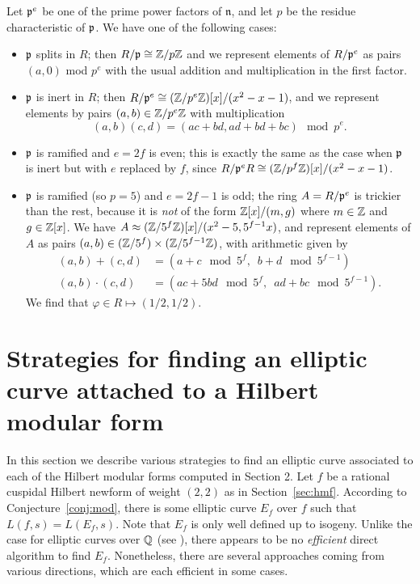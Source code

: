 \documentclass{amsart}
\newcommand{\n}{\mathfrak{n}}
\begin{document}
Let $\mathfrak{p}^e$ be one of the prime power factors of $\n$, and let $p$ be the residue
characteristic of $\mathfrak{p}$. We have one of the following cases:
\begin{itemize}
\item $\mathfrak{p}$ splits in $R$; then $R/\mathfrak{p}\cong \mathbb{Z}/p\mathbb{Z}$ and we represent elements
of $R/\mathfrak{p}^e$ as pairs $(a,0)$ mod $p^e$ with the usual addition and multiplication
in the first factor.
\item $\mathfrak{p}$ is inert in $R$; then $R/\mathfrak{p}^e\cong (\mathbb{Z}/p^e\mathbb{Z})[x]/(x^2-x-1)$,
and we represent elements by pairs $(a,b) \in \mathbb{Z}/p^e\mathbb{Z}$ with multiplication
$$(a,b)(c,d) = (ac+bd,ad+bd+bc) \mod p^e.$$
\item $\mathfrak{p}$ is ramified and $e=2f$ is even; this is exactly the
same as the case when $\mathfrak{p}$ is inert but with $e$ replaced by $f$,
since $R/\mathfrak{p}^eR \cong (\mathbb{Z}/p^{f}\mathbb{Z})[x]/(x^2-x-1)$.
\item $\mathfrak{p}$ is ramified (so $p=5$) and $e=2f-1$ is odd; the ring $A=R/\mathfrak{p}^e$
  is trickier than the rest, because it is {\em not} of the form
  $\mathbb{Z}[x]/(m,g)$ where $m\in\mathbb{Z}$ and $g \in\mathbb{Z}[x]$.  We have $A \approx
  (\mathbb{Z}/5^f\mathbb{Z})[x]/(x^2-5, 5^{f-1}x)$, and represent elements of $A$ as
  pairs $(a,b) \in (\mathbb{Z}/5^f)\times (\mathbb{Z}/5^{f-1}\mathbb{Z})$, with arithmetic
  given by
\begin{align*}
(a,b) + (c,d) &= (a+c \mod 5^f,\,\,\, b+d \mod 5^{f-1})\\
(a,b)\cdot (c,d) &= (ac+5bd \mod 5^f,\,\,\, ad+bc \mod 5^{f-1}).
\end{align*}
 We find that $ \varphi \in R \mapsto (1/2,1/2)$.
\end{itemize}



\section{Strategies for finding an elliptic curve attached to a Hilbert modular form}\label{sec:finding}
In this section we describe various strategies to find an elliptic curve
 associated to each of the Hilbert modular forms computed in Section 2.
Let $f$ be a rational cuspidal Hilbert newform of weight $(2,2)$ as
in Section~\ref{sec:hmf}.  According to Conjecture~\ref{conj:mod},
there is some elliptic curve $E_f$ over $f$ such that $L(f,s) =
L(E_f,s)$.  Note that $E_f$ is only well defined up to isogeny.
Unlike the case for elliptic curves over $\mathbb{Q}$ (see \cite{cremona:algs}), 
there appears to be no {\em efficient} direct algorithm to find $E_f$.
 Nonetheless, there are several approaches coming from various directions, 
which are each efficient in some cases.
\end{document}
